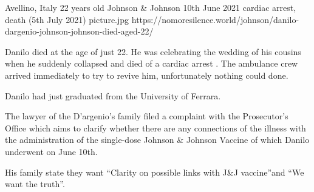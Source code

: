           {Avellino, Italy}
          {22 years old}
          {Johnson \& Johnson }
          {10th June 2021}
          {cardiac arrest, death (5th July 2021)}
          {picture.jpg}
          {https://nomoresilence.world/johnson/danilo-dargenio-johnson-johnson-died-aged-22/}
          {

Danilo died at the age of just 22. He was celebrating the wedding of his cousins
when he suddenly collapsed and died of a cardiac arrest . The ambulance crew
arrived immediately to try to revive him, unfortunately nothing could done.

Danilo had just graduated from the University of Ferrara.

The lawyer of the D'argenio’s family filed a complaint with the Prosecutor’s
Office which aims to clarify whether there are any connections of the illness
with the administration of the single-dose Johnson \& Johnson Vaccine of which
Danilo underwent on June 10th.

His family state they want “Clarity on possible links with J\&J vaccine”and “We
want the truth”.

}
